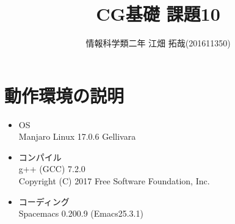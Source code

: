 \documentclass{scrartcl}
\author{情報科学類二年 江畑 拓哉(201611350)}
\date{}
\title{CG基礎 課題10}
\begin{document}
\maketitle

\section{動作環境の説明}
\label{sec:org4d2378d}
\begin{itemize}
\item OS\\
Manjaro Linux 17.0.6 Gellivara\\
\item コンパイル\\
g++ (GCC) 7.2.0\\
Copyright (C) 2017 Free Software Foundation, Inc.\\
\item コーディング\\
Spacemacs 0.200.9 (Emacs25.3.1)\\
\end{itemize}
\end{document}
